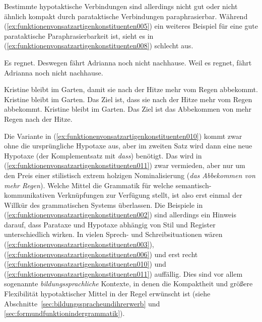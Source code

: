 Bestimmte hypotaktische Verbindungen sind allerdings nicht gut oder nicht ähnlich kompakt durch parataktische Verbindungen paraphrasierbar.
Während (\ref{ex:funktionenvonsatzartigenkonstituenten005}) ein weiteres Beispiel für eine gute parataktische Paraphrasierbarkeit ist, sieht es in (\ref{ex:funktionenvonsatzartigenkonstituenten008}) schlecht aus.

\begin{exe}
  \ex\label{ex:funktionenvonsatzartigenkonstituenten005}
  \begin{xlist}
    \ex\label{ex:funktionenvonsatzartigenkonstituenten006} Es regnet. Deswegen fährt Adrianna noch nicht nachhause.
    \ex\label{ex:funktionenvonsatzartigenkonstituenten007} Weil es regnet, fährt Adrianna noch nicht nachhause.
  \end{xlist}
  \ex\label{ex:funktionenvonsatzartigenkonstituenten008}
  \begin{xlist}
    \ex\label{ex:funktionenvonsatzartigenkonstituenten009} Kristine bleibt im Garten, damit sie nach der Hitze mehr vom Regen abbekommt.
    \ex\label{ex:funktionenvonsatzartigenkonstituenten010} Kristine bleibt im Garten. Das Ziel ist, dass sie nach der Hitze mehr vom Regen abbekommt.
    \ex\label{ex:funktionenvonsatzartigenkonstituenten011} Kristine bleibt im Garten. Das Ziel ist das Abbekommen von mehr Regen nach der Hitze.
  \end{xlist}
\end{exe}

Die Variante in (\ref{ex:funktionenvonsatzartigenkonstituenten010}) kommt zwar ohne die ursprüngliche Hypotaxe aus, aber im zweiten Satz wird dann eine neue Hypotaxe (der Komplementsatz mit \textit{dass}) benötigt.
Das wird in (\ref{ex:funktionenvonsatzartigenkonstituenten011}) zwar vermieden, aber nur um den Preis einer stilistisch extrem holzigen Nominalisierung (\textit{das Abbekommen von mehr Regen}).
Welche Mittel die Grammatik für welche semantisch-kommunikativen Verknüpfungen zur Verfügung stellt, ist also erst einmal der Willkür des grammatischen Systems überlassen.
Die Beispiele in (\ref{ex:funktionenvonsatzartigenkonstituenten002}) sind allerdings ein Hinweis darauf, dass Parataxe und Hypotaxe abhängig von Stil und Register unterschiedlich wirken.
In vielen Sprech- und Schreibsituationen wären (\ref{ex:funktionenvonsatzartigenkonstituenten003}), (\ref{ex:funktionenvonsatzartigenkonstituenten006}) und erst recht (\ref{ex:funktionenvonsatzartigenkonstituenten010}) und (\ref{ex:funktionenvonsatzartigenkonstituenten011}) auffällig.
Dies sind vor allem sogenannte \textit{bildungssprachliche} Kontexte, in denen die Kompaktheit und größere Flexibilität hypotaktischer Mittel in der Regel erwünscht ist (siehe Abschnitte~\ref{sec:bildungsspracheundihrerwerb} und \ref{sec:formundfunktionindergrammatik}).

